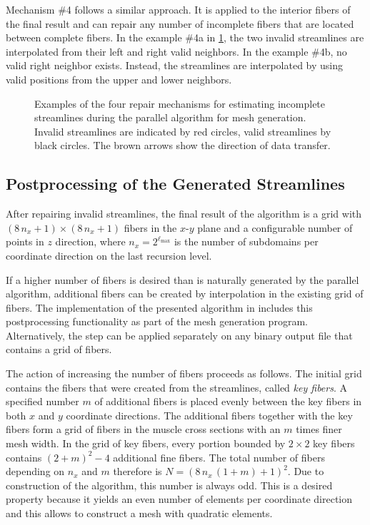 Mechanism \#4 follows a similar approach. It is applied to the interior fibers of the final result and can repair any number of incomplete fibers that are located between complete fibers. In the example \#4a in \cref{fig:fix_invalid}, the two invalid streamlines are interpolated from their left and right valid neighbors. In the example \#4b, no valid right neighbor exists. Instead, the streamlines are interpolated by using valid positions from the upper and lower neighbors.

\begin{figure}%
  \centering%
  \def\svgwidth{0.8\textwidth}
  
  \caption{Examples of the four repair mechanisms for estimating incomplete streamlines during the parallel algorithm for mesh generation. Invalid streamlines are indicated by red circles, valid streamlines by black circles. The brown arrows show the direction of data transfer.}%
  \label{fig:fix_invalid}%
\end{figure}%

\subsection{Postprocessing of the Generated Streamlines}

After repairing invalid streamlines, the final result of the algorithm is a grid with $(8\,n_x+1) \times (8\,n_x+1)$ fibers in the $x$-$y$ plane and a configurable number of points in $z$ direction, where $n_x = 2^{\ell_\text{max}}$ is the number of subdomains per coordinate direction on the last recursion level. 

If a higher number of fibers is desired than is naturally generated by the parallel algorithm, additional fibers can be created by interpolation in the existing grid of fibers. The implementation of the presented algorithm in \opendihu{} includes this postprocessing functionality as part of the mesh generation program. Alternatively, the step can be applied separately on any binary output file that contains a grid of fibers. 

The action of increasing the number of fibers proceeds as follows. The initial grid contains the fibers that were created from the streamlines, called \emph{key fibers}.
A specified number $m$ of additional fibers is placed evenly between the key fibers in both $x$ and $y$ coordinate directions.
The additional fibers together with the key fibers form a grid of fibers in the muscle cross sections with an $m$ times finer mesh width. In the grid of key fibers, every portion bounded by $2 \times 2$ key fibers contains $(2+m)^2 - 4$ additional fine fibers. The total number of fibers depending on $n_x$ and $m$ therefore is $N=(8\,n_x\,(1+m)+1)^2$. Due to construction of the algorithm, this number is always odd. This is a desired property because it yields an even number of elements per coordinate direction and this allows to construct a mesh with quadratic elements.

